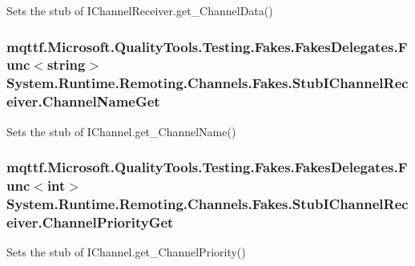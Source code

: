 Sets the stub of I\-Channel\-Receiver.\-get\-\_\-\-Channel\-Data()

\hypertarget{class_system_1_1_runtime_1_1_remoting_1_1_channels_1_1_fakes_1_1_stub_i_channel_receiver_af4582da4a377f30ef3e9bb4ad88da489}{
\subsubsection[{Channel\-Name\-Get}]{\setlength{\rightskip}{0pt plus 5cm}mqttf.\-Microsoft.\-Quality\-Tools.\-Testing.\-Fakes.\-Fakes\-Delegates.\-Func$<$string$>$ System.\-Runtime.\-Remoting.\-Channels.\-Fakes.\-Stub\-I\-Channel\-Receiver.\-Channel\-Name\-Get}}\label{class_system_1_1_runtime_1_1_remoting_1_1_channels_1_1_fakes_1_1_stub_i_channel_receiver_af4582da4a377f30ef3e9bb4ad88da489}


Sets the stub of I\-Channel.\-get\-\_\-\-Channel\-Name()

\hypertarget{class_system_1_1_runtime_1_1_remoting_1_1_channels_1_1_fakes_1_1_stub_i_channel_receiver_abacac5b46911ada670b855466b9cfbaa}{
\subsubsection[{Channel\-Priority\-Get}]{\setlength{\rightskip}{0pt plus 5cm}mqttf.\-Microsoft.\-Quality\-Tools.\-Testing.\-Fakes.\-Fakes\-Delegates.\-Func$<$int$>$ System.\-Runtime.\-Remoting.\-Channels.\-Fakes.\-Stub\-I\-Channel\-Receiver.\-Channel\-Priority\-Get}}\label{class_system_1_1_runtime_1_1_remoting_1_1_channels_1_1_fakes_1_1_stub_i_channel_receiver_abacac5b46911ada670b855466b9cfbaa}


Sets the stub of I\-Channel.\-get\-\_\-\-Channel\-Priority()

